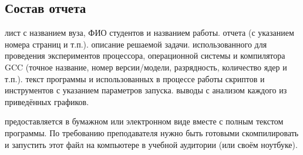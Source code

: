 { %
	\subsection{Состав отчета}
	\begin{enumerate}
		 лист с названием вуза, ФИО студентов и названием работы.
		 отчета (с указанием номера страниц и т.п.).
		 описание решаемой задачи.
		 использованного для проведения экспериментов  процессора, операционной системы и компилятора GCC  (точное название, номер версии/модели, разрядность, количество ядер и т.п.).
		 текст программы и использованных в процессе работы скриптов и инструментов с указанием параметров запуска.
		 выводы с анализом каждого из приведённых графиков.
	\end{enumerate}
	 предоставляется в бумажном или электронном виде вместе с полным текстом программы. По требованию преподавателя нужно быть готовыми скомпилировать и запустить этот файл на компьютере в учебной аудитории (или своём ноутбуке).
	\par
}